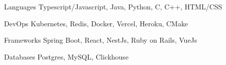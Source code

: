 

\begin{cvskills}

  \cvskill
  {Languages}
  {Typescript/Javascript, Java, Python, C, C++, HTML/CSS}

  \cvskill
  {DevOps}
  {Kubernetes, Redis, Docker, Vercel, Heroku, CMake}

  \cvskill
  {Frameworks}
  {Spring Boot, React, NestJs, Ruby on Rails, VueJs}

  \cvskill
  {Databases}
  {Postgres, MySQL, Clickhouse}

\end{cvskills}
